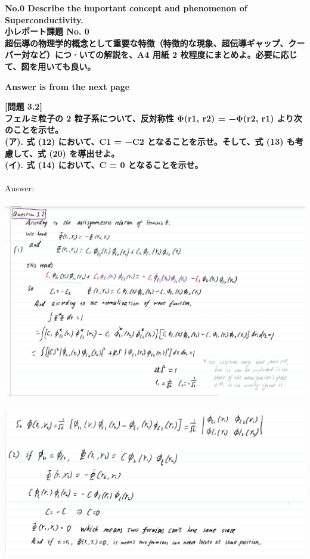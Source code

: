 \documentclass[11pt,largemargins]{homework}
\begin{document}
\maketitle
\newpage
\question
\textbf{No.0\; Describe the important concept and phenomenon of Superconductivity.
\\小レポート課題 No. 0\\超伝導の物理学的概念として重要な特徴（特徴的な現象、超伝導ギャップ、クーパー対など）につ·いての解説を、A4 用紙 2 枚程度にまとめよ。必要に応じて、図を用いても良い。}

\textbf{Answer is from the next page}

\question
\textbf{[問題 3.2]
\\フェルミ粒子の 2 粒子系について、反対称性 Φ(r1, r2) = −Φ(r2, r1) より次のことを示せ。
\\(ア). 式 (12) において、C1 = −C2 となることを示せ。そして、式 (13) も考慮して、式 (20) を導出せよ。
\\(イ). 式 (14) において、C = 0 となることを示せ。}\\
\\Answer:\\\\
\includegraphics[scale=0.5]{Question/Q3.2.jpg}\\\\
\includegraphics[scale=0.5]{Question/Q3.2-02.jpg}
\end{document}
